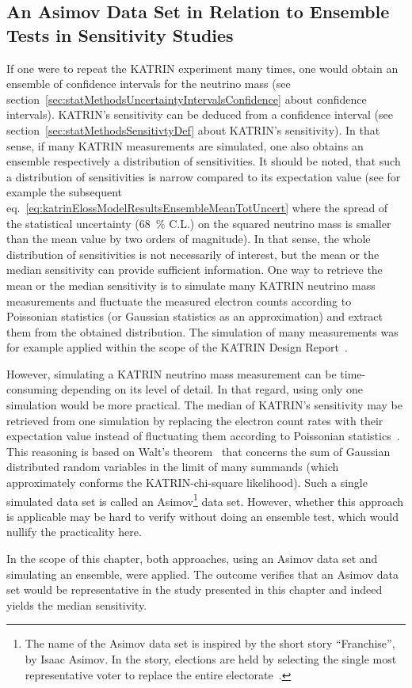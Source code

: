 \subsection{An Asimov Data Set in Relation to Ensemble Tests in Sensitivity Studies}
\label{sec:katrinElossStatisticsAsimov}
If one were to repeat the KATRIN experiment many times, one would obtain an ensemble of confidence intervals for the neutrino mass (see section~\ref{sec:statMethodsUncertaintyIntervalsConfidence} about confidence intervals). KATRIN's sensitivity can be deduced from a confidence interval (see section~\ref{sec:statMethodsSensitivtyDef} about KATRIN's sensitivity). In that sense, if many KATRIN measurements are simulated, one also obtains an ensemble respectively a distribution of sensitivities. It should be noted, that such a distribution of sensitivities is narrow compared to its expectation value (see for example the subsequent eq.~\ref{eq:katrinElossModelResultsEnsembleMeanTotUncert} where the spread of the statistical uncertainty (\SI{68}{\percent} C.L.) on the squared neutrino mass is smaller than the mean value by two orders of magnitude). In that sense, the whole distribution of sensitivities is not necessarily of interest, but the mean or the median sensitivity can provide sufficient information. One way to retrieve the mean or the median sensitivity is to simulate many KATRIN neutrino mass measurements and fluctuate the measured electron counts according to Poissonian statistics (or Gaussian statistics as an approximation) and extract them from the obtained distribution. The simulation of many measurements was for example applied within the scope of the KATRIN Design Report~\cite{Angrik:2005ep}.

However, simulating a KATRIN neutrino mass measurement can be time-consuming depending on its level of detail. In that regard, using only one simulation would be more practical. The median of KATRIN's sensitivity may be retrieved from one simulation by replacing the electron count rates with their expectation value instead of fluctuating them according to Poissonian statistics~\cite{Cowan2011}. This reasoning is based on Walt's theorem~\cite{Wald1944} that concerns the sum of Gaussian distributed random variables in the limit of many summands (which approximately conforms the KATRIN-chi-square likelihood). Such a single simulated data set is called an Asimov\footnote{The name of the Asimov data set is inspired by the short story ``Franchise'', by Isaac Asimov. In the story, elections are held by selecting the single most representative voter to replace the entire electorate~\cite{Cowan2011}.} data set. However, whether this approach is applicable may be hard to verify without doing an ensemble test, which would nullify the practicality here.

In the scope of this chapter, both approaches, using an Asimov data set and simulating an ensemble, were applied. The outcome verifies that an Asimov data set would be representative in the study presented in this chapter and indeed yields the median sensitivity.